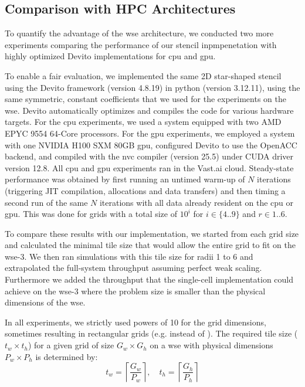 \subsection{Comparison with HPC Architectures}
To quantify the advantage of the \ac{wse} architecture, we conducted two more experiments comparing the performance of our stencil inpmpenetation with highly optimized Devito implementations for \ac{cpu} and \ac{gpu}. 

To enable a fair evaluation, we implemented the same 2D star-shaped stencil using the Devito framework (version 4.8.19) in python (version 3.12.11), using the same symmetric, constant coefficients that we used for the experiments on the \ac{wse}.
Devito automatically optimizes and compiles the code for various hardware targets.
For the \ac{cpu} experiments, we used a system equipped with two AMD EPYC 9554 64-Core processors. For the \ac{gpu} experiments, we employed a system with one NVIDIA H100 SXM 80GB \ac{gpu}, configured Devito to use the OpenACC backend, and compiled with the nvc compiler (version 25.5) under CUDA driver version 12.8. All \ac{cpu} and \ac{gpu} experiments ran in the Vast.ai cloud.
Steady-state performance was obtained by first running an untimed warm-up of $N$ iterations (triggering JIT compilation, allocations and data transfers) and then timing a second run of the same $N$ iterations with all data already resident on the \ac{cpu} or \ac{gpu}.
This was done for grids with a total size of $10^i$ for $i \in \{4..9\}$ and $r\in{1..6}$.

To compare these results with our implementation, we started from each grid size and calculated the minimal tile size that would allow the entire grid to fit on the \ac{wse}-3.
We then ran simulations with this tile size for radii 1 to 6 and extrapolated the full-system throughput assuming perfect weak scaling. Furthermore we added the throughput that the single-cell implementation could achieve on the \ac{wse}-3 where the problem size is smaller than the physical dimensions of the \ac{wse}.

In all experiments, we strictly used powers of 10 for the grid dimensions, sometimes resulting in rectangular grids (e.g.  instead of ). The required tile size ($t_w \times t_h$) for a given grid of size $G_w \times G_h$ on a \ac{wse} with physical dimensions $P_w \times P_h$ is determined by:
\begin{equation}
    t_w = \left\lceil \frac{G_w}{P_w} \right\rceil, \quad t_h = \left\lceil \frac{G_h}{P_h} \right\rceil
\end{equation}

